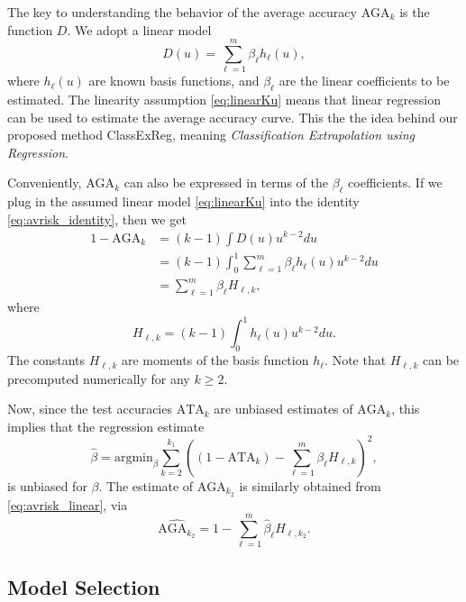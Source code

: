 \documentclass[twoside,11pt]{article}
\newcommand{\argmin}{\text{argmin}}
\begin{document}
The key to understanding the behavior of the average accuracy
$\text{AGA}_k$ is the function ${D}$.  We adopt a linear model
\begin{equation}\label{eq:linearKu}
{D}(u) = \sum_{\ell = 1}^m \beta_\ell h_\ell(u),
\end{equation}
where $h_\ell(u)$ are known basis functions, and $\beta_\ell$ are the
linear coefficients to be estimated.  The linearity assumption \eqref{eq:linearKu} means that linear regression can be used to estimate the average accuracy curve.  This the the idea behind our proposed method ClassExReg,
meaning \emph{Classification Extrapolation using Regression}.

Conveniently, $\text{AGA}_k$ can also be expressed in terms of the $\beta_\ell$ coefficients.
If we plug in the assumed linear model \eqref{eq:linearKu} into the
identity \eqref{eq:avrisk_identity}, then we get
\begin{align}
1 - \text{AGA}_k &= (k-1)\int {D}(u) u^{k-2} du
\\&= (k-1)\int_0^1 \sum_{\ell = 1}^m \beta_\ell h_\ell(u) u^{k-2} du
\\&= \sum_{\ell = 1}^m \beta_\ell H_{\ell,k}, \label{eq:avrisk_linear}
\end{align}
where
\begin{equation}
H_{\ell,k} = (k-1) \int_0^1 h_\ell(u) u^{k-2} du.
\end{equation}
The constants $H_{\ell, k}$ are moments of the basis function
$h_\ell$.  Note that $H_{\ell, k}$ can be precomputed numerically for any $k \geq 2$.

Now, since the test accuracies $\text{ATA}_k$ are unbiased estimates
of $\text{AGA}_{k}$, this implies that the regression estimate
\[
\hat{\beta} = \argmin_\beta \sum_{k=2}^{k_1} \left( (1 - \text{ATA}_k) - \sum_{\ell=1}^m \beta_\ell H_{\ell, k}\right)^2,
\]
is unbiased for $\beta$. The estimate of $\text{AGA}_{k_2}$ is similarly obtained
from \eqref{eq:avrisk_linear}, via
\begin{equation}\label{eq:avrisk_hat}
\widehat{\text{AGA}_{k_2}} = 1 - \sum_{\ell=1}^m \hat{\beta}_\ell H_{\ell, k_2}.
\end{equation}

\subsection{Model Selection}\label{sec:modelselection}
\end{document}
